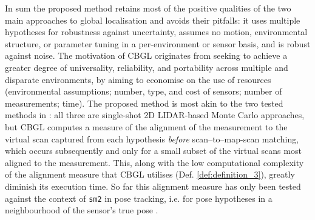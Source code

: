 In sum the proposed method retains most of the positive qualities of the two
main approaches to global localisation and avoids their pitfalls: it uses
multiple hypotheses for robustness against uncertainty, assumes no motion,
environmental structure, or parameter tuning in a per-environment or sensor
basis, and is robust against noise.  The motivation of CBGL originates from
seeking to achieve a greater degree of universality, reliability, and
portability across multiple and disparate environments, by aiming to economise
on the use of resources (environmental assumptions; number, type, and cost of
sensors; number of measurements; time). The proposed method is most akin to the
two tested methods in \cite{Filotheou2022g}: all three are single-shot 2D
LIDAR-based Monte Carlo approaches, but CBGL computes a measure of the
alignment of the measurement to the virtual scan captured from each hypothesis
\textit{before} scan--to--map-scan matching, which occurs subsequently and only
for a small subset of the virtual scans most aligned to the
measurement. This, along with the low computational complexity of the alignment
measure that CBGL utilises (Def. \ref{def:definition_3}), greatly diminish its
execution time. So far this alignment measure has only been tested against the
context of \texttt{sm2} in pose tracking, i.e. for pose hypotheses in a
neighbourhood of the sensor's true pose \cite{Filotheou2022f,Filotheou2023a}.
